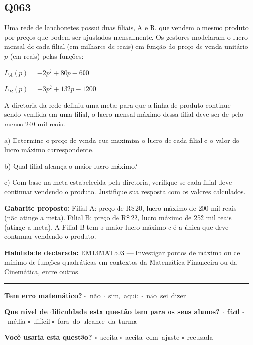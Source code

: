 \documentclass[11pt,a4paper]{article}
\begin{document}
\begin{samepage}
\subsection*{Q063}
Uma rede de lanchonetes possui duas filiais, A e B, que vendem o mesmo produto por preços que podem ser ajustados mensalmente. Os gestores modelaram o lucro mensal de cada filial (em milhares de reais) em função do preço de venda unitário $p$ (em reais) pelas funções:

$L_A(p) = -2p^2 + 80p - 600$

$L_B(p) = -3p^2 + 132p - 1200$

A diretoria da rede definiu uma meta: para que a linha de produto continue sendo vendida em uma filial, o lucro mensal máximo dessa filial deve ser de pelo menos 240 mil reais.

a) Determine o preço de venda que maximiza o lucro de cada filial e o valor do lucro máximo correspondente.

b) Qual filial alcança o maior lucro máximo?

c) Com base na meta estabelecida pela diretoria, verifique se cada filial deve continuar vendendo o produto. Justifique sua resposta com os valores calculados.

\textbf{Gabarito proposto:} Filial A: preço de R\$\,20, lucro máximo de 200 mil reais (não atinge a meta). Filial B: preço de R\$\,22, lucro máximo de 252 mil reais (atinge a meta). A Filial B tem o maior lucro máximo e é a única que deve continuar vendendo o produto.

\textbf{Habilidade declarada:} EM13MAT503 --- Investigar pontos de máximo ou de mínimo de funções quadráticas em contextos da Matemática Financeira ou da Cinemática, entre outros.
\end{samepage}

\noindent\rule{\linewidth}{0.4pt}
\textbf{Tem erro matemático?}\quad
\mbox{$\square$~não} \quad \mbox{$\square$~sim, aqui:} \underline{\hspace{5cm}}
\quad \mbox{$\square$~não sei dizer}

\textbf{Que nível de dificuldade esta questão tem para os seus alunos?}\quad
\mbox{$\square$~fácil} \quad \mbox{$\square$~média} \quad
\mbox{$\square$~difícil} \quad \mbox{$\square$~fora do alcance da turma}

\textbf{Você usaria esta questão?}\quad
\mbox{$\square$~aceita} \quad \mbox{$\square$~aceita com ajuste} \quad
\mbox{$\square$~recusada}
\end{document}
